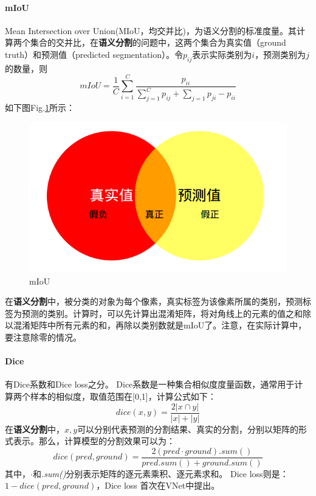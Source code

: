 \paragraph{mIoU}
Mean Intersection over Union(MIoU，均交并比)，为语义分割的标准度量。其计算两个集合的交并比，在\textbf{语义分割}的问题中，这两个集合为真实值（ground truth）和预测值（predicted segmentation）。令$p_{ij}$表示实际类别为$i$，预测类别为$j$的数量，则
$$
mIoU = \frac{1}{C} \sum_{i=1}^{C} \frac{p_{ii}}{ \sum_{j=1}^{C} p_{ij} + \sum_{j=1} p_{ji} - p_{ii} }
$$
如下图Fig.\ref{fig:miou}所示：
\begin{figure}[h]
	\centering
	\includegraphics[width=.6\textwidth]{pics/miou.png}
	\caption{mIoU}
	\label{fig:miou}
\end{figure}
在\textbf{语义分割}中，被分类的对象为每个像素，真实标签为该像素所属的类别，预测标签为预测的类别。计算时，可以先计算出混淆矩阵，将对角线上的元素的值之和除以混淆矩阵中所有元素的和，再除以类别数就是mIoU了。注意，在实际计算中，要注意除零的情况。

\paragraph{Dice}
有Dice系数和Dice loss之分。
Dice系数是一种集合相似度度量函数，通常用于计算两个样本的相似度，取值范围在[0,1]，计算公式如下：
$$
dice(x, y) = \frac{2|x \cap y|}{|x| + |y|}
$$
在\textbf{语义分割}中，$x, y$可以分别代表预测的分割结果、真实的分割，分别以矩阵的形式表示。那么，计算模型的分割效果可以为：
$$
dice(pred, ground) = \frac{2(pred \cdot ground).sum()}{pred.sum() + ground.sum()}
$$
其中，$\cdot$和\textit{.sum()}分别表示矩阵的逐元素乘积、逐元素求和。
Dice loss则是：$1 - dice(pred, ground)$，Dice loss 首次在VNet中提出。

